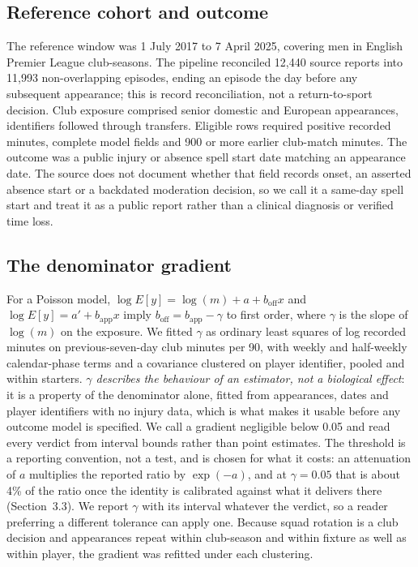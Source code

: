 \documentclass[11pt]{article}
\begin{document}
\subsection{Reference cohort and outcome}

The reference window was 1 July 2017 to 7 April 2025, covering men in English Premier League club-seasons. The pipeline reconciled 12,440 source reports into 11,993 non-overlapping episodes, ending an episode the day before any subsequent appearance; this is record reconciliation, not a return-to-sport decision. Club exposure comprised senior domestic and European appearances, identifiers followed through transfers. Eligible rows required positive recorded minutes, complete model fields and 900 or more earlier club-match minutes. The outcome was a public injury or absence spell start date matching an appearance date. The source does not document whether that field records onset, an asserted absence start or a backdated moderation decision, so we call it a same-day spell start and treat it as a public report rather than a clinical diagnosis or verified time loss.

\subsection{The denominator gradient}

For a Poisson model, $\log E[y]=\log(m)+a+b_{\text{off}}x$ and $\log E[y]=a'+b_{\text{app}}x$ imply $b_{\text{off}}=b_{\text{app}}-\gamma$ to first order, where $\gamma$ is the slope of $\log(m)$ on the exposure. We fitted $\gamma$ as ordinary least squares of log recorded minutes on previous-seven-day club minutes per 90, with weekly and half-weekly calendar-phase terms and a covariance clustered on player identifier, pooled and within starters. \emph{$\gamma$ describes the behaviour of an estimator, not a biological effect}: it is a property of the denominator alone, fitted from appearances, dates and player identifiers with no injury data, which is what makes it usable before any outcome model is specified. We call a gradient negligible below 0.05 and read every verdict from interval bounds rather than point estimates. The threshold is a reporting convention, not a test, and is chosen for what it costs: an attenuation of $a$ multiplies the reported ratio by $\exp(-a)$, and at $\gamma=0.05$ that is about 4\% of the ratio once the identity is calibrated against what it delivers there (Section~3.3). We report $\gamma$ with its interval whatever the verdict, so a reader preferring a different tolerance can apply one. Because squad rotation is a club decision and appearances repeat within club-season and within fixture as well as within player, the gradient was refitted under each clustering.
\end{document}
